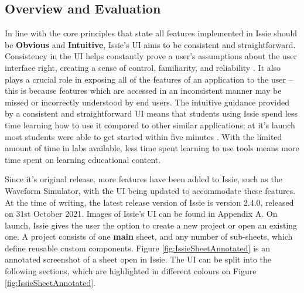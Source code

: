 \subsection{Overview and Evaluation}
In line with the core principles that state all features implemented in Issie should be \textbf{Obvious} and \textbf{Intuitive}, Issie's UI aims to be consistent and straightforward. Consistency in the UI helps constantly prove a user’s assumptions about the user interface right, creating a sense of control, familiarity, and reliability \cite{uiconsistency}. It also plays a crucial role in exposing all of the features of an application to the user -- this is because features which are accessed in an inconsistent manner may be missed or incorrectly understood by end users. The intuitive guidance provided by a consistent and straightforward UI means that students using Issie spend less time learning how to use it compared to other similar applications; at it's launch most students were able to get started within five minutes \cite{marco_diss}. With the limited amount of time in labs available, less time spent learning to use tools means more time spent on learning educational content.

Since it's original release, more features have been added to Issie, such as the Waveform Simulator, with the UI being updated to accommodate these features. At the time of writing, the latest release version of Issie is version 2.4.0, released on 31st October 2021. Images of Issie's UI can be found in Appendix A. On launch, Issie gives the user the option to create a new project or open an existing one. A project consists of one \textbf{main} sheet, and any number of sub-sheets, which define reusable custom components. Figure \ref{fig:IssieSheetAnnotated} is an annotated screenshot of a sheet open in Issie. The UI can be split into the following sections, which are highlighted in different colours on Figure \ref{fig:IssieSheetAnnotated}.

